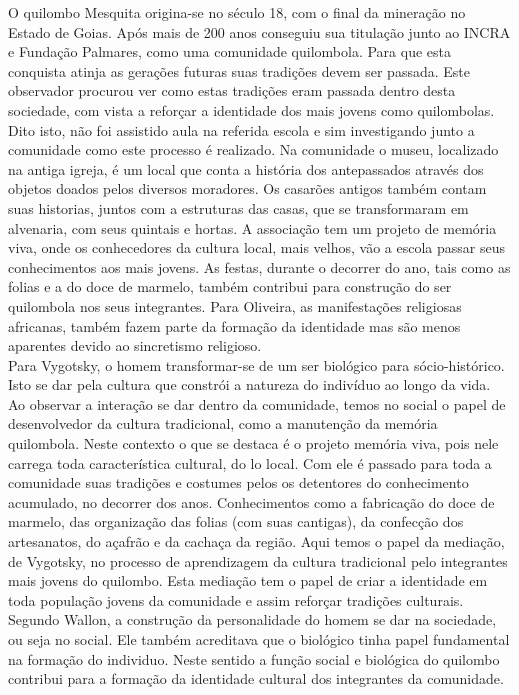 \hspace{1.5cm}
O quilombo Mesquita origina-se no século 18, com o final da mineração no Estado de Goias. Após mais de 200 anos conseguiu sua titulação junto ao INCRA e Fundação Palmares, como uma comunidade quilombola. Para que esta conquista atinja as gerações futuras suas tradições devem ser passada. Este observador procurou ver como estas tradições eram passada dentro desta sociedade, com vista a reforçar a identidade dos mais jovens como quilombolas. Dito isto, não foi assistido aula na referida escola e sim investigando junto a comunidade como este processo é realizado. Na comunidade o museu, localizado na antiga igreja, é um local que conta a história dos antepassados através dos objetos doados pelos diversos moradores. Os casarões antigos também contam suas historias, juntos com a estruturas das casas, que se transformaram em alvenaria, com seus quintais e hortas. A associação tem um projeto de memória viva, onde os conhecedores da cultura local, mais velhos, vão a escola passar seus conhecimentos aos mais jovens. As festas, durante o decorrer do ano, tais como as folias e a do doce de marmelo, também contribui para construção do ser quilombola nos seus integrantes. Para Oliveira, as manifestações religiosas africanas, também fazem parte da formação da identidade mas são menos aparentes devido ao sincretismo religioso.\\

\hspace{1.5cm}
Para Vygotsky\cite{marta}, o homem transformar-se de um ser biológico para sócio-histórico. Isto se dar pela cultura  que constrói a natureza do indivíduo ao longo da vida. Ao observar a interação se dar dentro da comunidade, temos no social o papel de desenvolvedor da cultura tradicional, como a manutenção da memória quilombola. Neste contexto o que se destaca é o projeto memória viva, pois nele carrega toda característica cultural, do lo local. Com ele é passado para toda a comunidade suas tradições e costumes pelos os detentores do conhecimento acumulado, no decorrer dos anos. Conhecimentos como a fabricação do doce de marmelo, das organização das folias (com suas cantigas), da confecção dos artesanatos, do açafrão e da cachaça da região. Aqui temos o papel da mediação, de Vygotsky, no processo de aprendizagem da cultura tradicional pelo integrantes mais jovens do quilombo. Esta mediação tem o papel de criar a identidade em toda população jovens da comunidade e assim reforçar tradições culturais. Segundo Wallon, a construção da personalidade do homem se dar na sociedade, ou seja no social. Ele também acreditava que o biológico tinha papel fundamental na formação do individuo. Neste sentido a função social e biológica do quilombo contribui para a formação da identidade cultural dos integrantes da comunidade.\\


